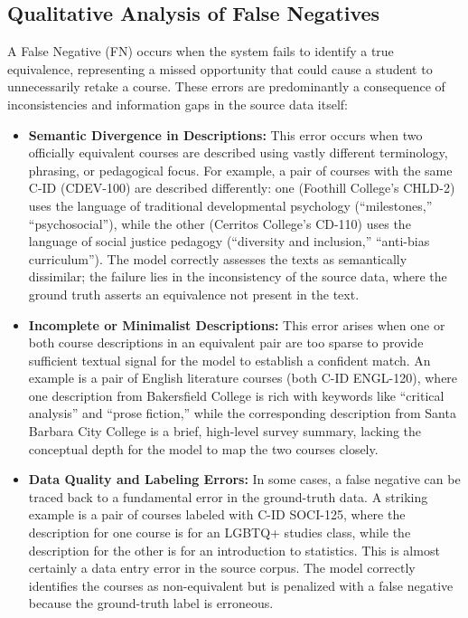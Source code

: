 \subsection{Qualitative Analysis of False Negatives}\label{ch:4.6.3}
A False Negative (FN) occurs when the system fails to identify a true equivalence, representing a missed opportunity that could cause a student to unnecessarily retake a course. These errors are predominantly a consequence of inconsistencies and information gaps in the source data itself:
\begin{itemize}
    \item \textbf{Semantic Divergence in Descriptions:} This error occurs when two officially equivalent courses are described using vastly different terminology, phrasing, or pedagogical focus. For example, a pair of courses with the same C-ID (CDEV-100) are described differently: one (Foothill College's CHLD-2) uses the language of traditional developmental psychology (``milestones,'' ``psychosocial''), while the other (Cerritos College's CD-110) uses the language of social justice pedagogy (``diversity and inclusion,'' ``anti-bias curriculum''). The model correctly assesses the texts as semantically dissimilar; the failure lies in the inconsistency of the source data, where the ground truth asserts an equivalence not present in the text.
    \item \textbf{Incomplete or Minimalist Descriptions:} This error arises when one or both course descriptions in an equivalent pair are too sparse to provide sufficient textual signal for the model to establish a confident match. An example is a pair of English literature courses (both C-ID ENGL-120), where one description from Bakersfield College is rich with keywords like ``critical analysis'' and ``prose fiction,'' while the corresponding description from Santa Barbara City College is a brief, high-level survey summary, lacking the conceptual depth for the model to map the two courses closely.
    \item \textbf{Data Quality and Labeling Errors:} In some cases, a false negative can be traced back to a fundamental error in the ground-truth data. A striking example is a pair of courses labeled with C-ID SOCI-125, where the description for one course is for an LGBTQ+ studies class, while the description for the other is for an introduction to statistics. This is almost certainly a data entry error in the source corpus. The model correctly identifies the courses as non-equivalent but is penalized with a false negative because the ground-truth label is erroneous.
\end{itemize}

